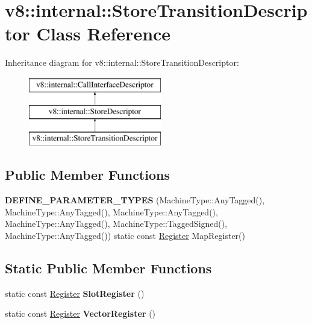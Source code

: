 \hypertarget{classv8_1_1internal_1_1StoreTransitionDescriptor}{}\section{v8\+:\+:internal\+:\+:Store\+Transition\+Descriptor Class Reference}
\label{classv8_1_1internal_1_1StoreTransitionDescriptor}
Inheritance diagram for v8\+:\+:internal\+:\+:Store\+Transition\+Descriptor\+:\begin{figure}[H]
\begin{center}
\leavevmode
\includegraphics[height=3.000000cm]{classv8_1_1internal_1_1StoreTransitionDescriptor}
\end{center}
\end{figure}
\subsection*{Public Member Functions}
\begin{DoxyCompactItemize}
\item 
\mbox{\label{classv8_1_1internal_1_1StoreTransitionDescriptor_a668ddf138bc1d27b8067320ea3e84b1d}} 
{\bfseries D\+E\+F\+I\+N\+E\+\_\+\+P\+A\+R\+A\+M\+E\+T\+E\+R\+\_\+\+T\+Y\+P\+ES} (Machine\+Type\+::\+Any\+Tagged(), Machine\+Type\+::\+Any\+Tagged(), Machine\+Type\+::\+Any\+Tagged(), Machine\+Type\+::\+Any\+Tagged(), Machine\+Type\+::\+Tagged\+Signed(), Machine\+Type\+::\+Any\+Tagged()) static const \mbox{\hyperlink{classv8_1_1internal_1_1Register}{Register}} Map\+Register()
\end{DoxyCompactItemize}
\subsection*{Static Public Member Functions}
\begin{DoxyCompactItemize}
\item 
\mbox{\label{classv8_1_1internal_1_1StoreTransitionDescriptor_a62a80b5e45d81ad846e43315412fccfe}} 
static const \mbox{\hyperlink{classv8_1_1internal_1_1Register}{Register}} {\bfseries Slot\+Register} ()
\item 
\mbox{\label{classv8_1_1internal_1_1StoreTransitionDescriptor_aa8c23fd04782cc7d56e9d4a3cc10625b}} 
static const \mbox{\hyperlink{classv8_1_1internal_1_1Register}{Register}} {\bfseries Vector\+Register} ()
\end{DoxyCompactItemize}
